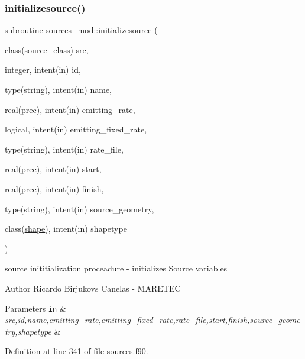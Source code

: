 \subsubsection{\texorpdfstring{initializesource()}{initializesource()}}
{\footnotesize\ttfamily subroutine sources\+\_\+mod\+::initializesource (\begin{DoxyParamCaption}\item[{class(\mbox{\hyperlink{structsources__mod_1_1source__class}{source\+\_\+class}})}]{src,  }\item[{integer, intent(in)}]{id,  }\item[{type(string), intent(in)}]{name,  }\item[{real(prec), intent(in)}]{emitting\+\_\+rate,  }\item[{logical, intent(in)}]{emitting\+\_\+fixed\+\_\+rate,  }\item[{type(string), intent(in)}]{rate\+\_\+file,  }\item[{real(prec), intent(in)}]{start,  }\item[{real(prec), intent(in)}]{finish,  }\item[{type(string), intent(in)}]{source\+\_\+geometry,  }\item[{class(\mbox{\hyperlink{structgeometry__mod_1_1shape}{shape}}), intent(in)}]{shapetype }\end{DoxyParamCaption})\hspace{0.3cm}{\ttfamily [private]}}



source inititialization proceadure -\/ initializes Source variables 

\begin{DoxyAuthor}{Author}
Ricardo Birjukovs Canelas -\/ M\+A\+R\+E\+T\+EC 
\end{DoxyAuthor}

\begin{DoxyParams}[1]{Parameters}
\mbox{\tt in}  & {\em src,id,name,emitting\+\_\+rate,emitting\+\_\+fixed\+\_\+rate,rate\+\_\+file,start,finish,source\+\_\+geometry,shapetype} & \\
\hline
\end{DoxyParams}


Definition at line 341 of file sources.\+f90.


